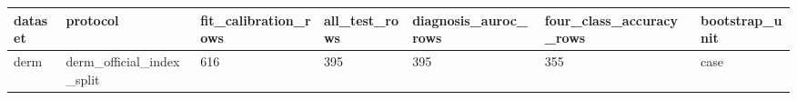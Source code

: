\begin{tabular}{lllllll}
\hline
dataset & protocol & fit\_calibration\_rows & all\_test\_rows & diagnosis\_auroc\_rows & four\_class\_accuracy\_rows & bootstrap\_unit \\
\hline
derm & derm\_official\_index\_split & 616 & 395 & 395 & 355 & case \\
\hline
\end{tabular}
